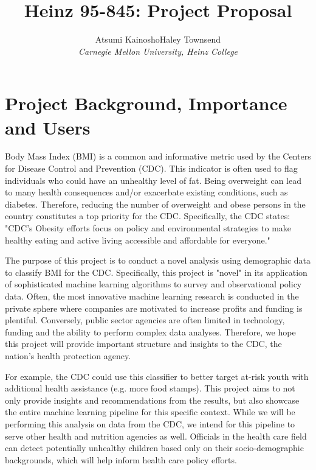 \documentclass[twoside,11pt]{article}
\begin{document}
\title{Heinz 95-845: Project Proposal}
\author{Atsumi Kainosho\qquad Haley Townsend\\
\em Carnegie Mellon University, Heinz College}

\maketitle

\section{Project Background, Importance and Users}
Body Mass Index (BMI) is a common and informative metric used by the Centers for Disease Control and Prevention (CDC). This indicator is often used to flag individuals who could have an unhealthy level of fat. Being overweight can lead to many health consequences and/or exacerbate existing conditions, such as diabetes. Therefore, reducing the number of overweight and obese persons in the country constitutes a top priority for the CDC. Specifically, the CDC states: "CDC’s Obesity efforts focus on policy and environmental strategies to make healthy eating and active living accessible and affordable for everyone." 

The purpose of this project is to conduct a novel analysis using demographic data to classify BMI for the CDC. Specifically, this project is "novel" in its application of sophisticated machine learning algorithms to survey and observational policy data. Often, the most innovative machine learning research is conducted in the private sphere where companies are motivated to increase profits and funding is plentiful. Conversely, public sector agencies are often limited in technology, funding and the ability to perform complex data analyses. Therefore, we hope this project will provide important structure and insights to the CDC, the nation's health protection agency. 

For example, the CDC could use this classifier to better target at-risk youth with additional health assistance (e.g. more food stamps). This project aims to not only provide insights and recommendations from the results, but also showcase the entire machine learning pipeline for this specific context. While we will be performing this analysis on data from the CDC, we intend for this pipeline to serve other health and nutrition agencies as well. Officials in the health care field can detect potentially unhealthy children based only on their socio-demographic backgrounds, which will help inform health care policy efforts. 
\end{document}
